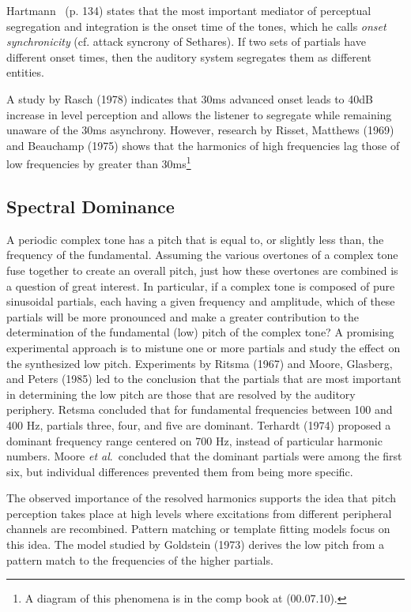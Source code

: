 Hartmann~\cite{Hartmann:1998} (p. 134) states that the most important mediator of
perceptual segregation and integration is the onset time of the tones, which
he calls \emph{onset synchronicity} (cf. attack syncrony of Sethares).  If two
sets of partials have different onset times, then the auditory system
segregates them as different entities.  

A study by Rasch (1978) indicates that 30ms advanced onset leads to 40dB
increase in level perception and allows the listener to segregate while
remaining unaware of the 30ms asynchrony.  However, research by Risset,
Matthews (1969) and Beauchamp (1975) shows that the harmonics of high
frequencies lag those of low frequencies by greater than 30ms\footnote{A
  diagram of this phenomena is in the comp book at (00.07.10).}

{\subsection{Spectral Dominance\protect\footnotemark }
}
A periodic complex tone has a pitch that is equal to, or slightly less
than, the frequency of the fundamental. 
Assuming the various overtones of a complex tone fuse together to
create an overall pitch, just how these overtones are combined is a
question of great interest.  In particular, if a complex tone is
composed of pure sinusoidal partials, each having a given frequency
and amplitude, which of these partials will be more pronounced and make a
greater contribution to the determination of the fundamental (low) pitch of
the complex tone?  A promising experimental approach is to mistune one
or more partials and study the effect on the synthesized low pitch.
Experiments by Ritsma (1967) and Moore, Glasberg, and Peters (1985)
led to the conclusion that the partials that are most important in
determining the low pitch are those that are resolved by the auditory
periphery.  Retsma concluded that for fundamental frequencies between
100 and 400 Hz, partials three, four, and five are dominant.  Terhardt
(1974) proposed a dominant frequency range centered on 700 Hz, instead
of particular harmonic numbers.  Moore {\it et al}.~concluded that the
dominant partials were among the first six, but individual differences
prevented them from being more specific.

The observed importance of the resolved harmonics supports the idea
that pitch perception takes place at high levels where excitations
from different peripheral channels are recombined.  Pattern matching
or template fitting models focus on this idea.  The model studied by
Goldstein (1973) derives the low pitch from a pattern match to the
frequencies of the higher partials.
